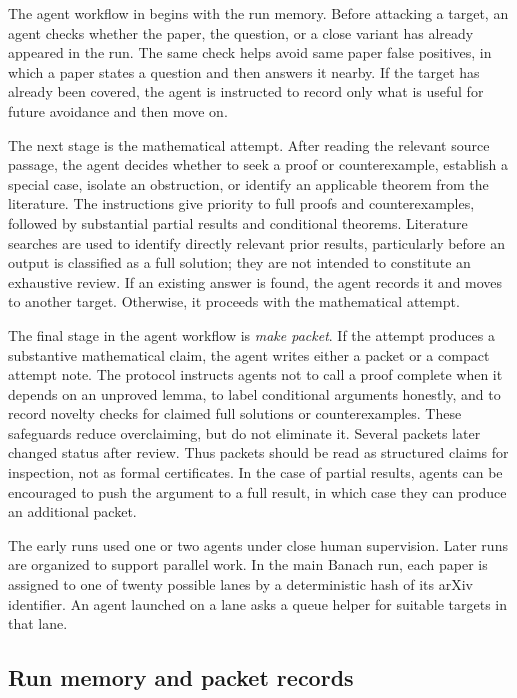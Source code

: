 \documentclass[11pt,reqno]{amsart}
\theoremstyle{plain}
\theoremstyle{definition}
\begin{document}
The agent workflow in  begins with the run memory. Before attacking a target, an agent checks whether the paper, the question, or a close variant has already appeared in the run. The same check helps avoid same paper false positives, in which a paper states a question and then answers it nearby. If the target has already been covered, the agent is instructed to record only what is useful for future avoidance and then move on.

The next stage is the mathematical attempt. After reading the relevant source passage, the agent decides whether to seek a proof or counterexample, establish a special case, isolate an obstruction, or identify an applicable theorem from the literature. The instructions give priority to full proofs and counterexamples, followed by substantial partial results and conditional theorems. Literature searches are used to identify directly relevant prior results, particularly before an output is classified as a full solution; they are not intended to constitute an exhaustive review. If an existing answer is found, the agent records it and moves to another target. Otherwise, it proceeds with the mathematical attempt.

The final stage in the agent workflow is \emph{make packet}. If the attempt produces a substantive mathematical claim, the agent writes either a packet or a compact attempt note. The protocol instructs agents not to call a proof complete when it depends on an unproved lemma, to label conditional arguments honestly, and to record novelty checks for claimed full solutions or counterexamples. These safeguards reduce overclaiming, but do not eliminate it. Several packets later changed status after review. Thus packets should be read as structured claims for inspection, not as formal certificates. In the case of partial results, agents can be encouraged to push the argument to a full result, in which case they can produce an additional packet.

The early runs used one or two agents under close human supervision. Later runs are organized to support parallel work. In the main Banach run, each paper is assigned to one of twenty possible lanes by a deterministic hash of its arXiv identifier. An agent launched on a lane asks a queue helper for suitable targets in that lane.

\subsection{Run memory and packet records}
\end{document}
